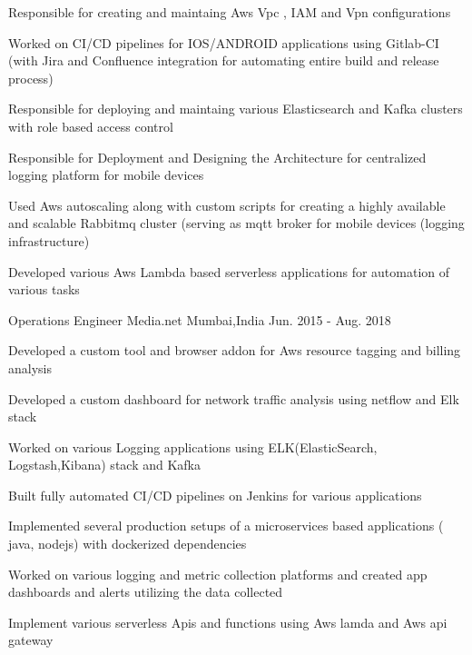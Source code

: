 \begin{cventries}
{\begin{cvitems}
	    \item { Responsible for creating and maintaing Aws Vpc , IAM and Vpn configurations}
		\item {Worked on CI/CD pipelines for IOS/ANDROID applications using Gitlab-CI (with Jira and Confluence integration for automating entire build and release process)}
		\item {Responsible for deploying and maintaing various Elasticsearch and Kafka clusters with role based access control }
		\item  { Responsible for Deployment and Designing the  Architecture for centralized logging platform for mobile devices}
		\item { Used Aws autoscaling along with custom scripts  for creating  a highly available and scalable   Rabbitmq cluster (serving as mqtt broker for mobile devices (logging infrastructure) }
		\item {Developed various  Aws Lambda based serverless applications for automation of various tasks }                   
	  \end{cvitems}
    }

  \cventry
    {Operations Engineer} %
    {Media.net} %
    {Mumbai,India} %
    {Jun. 2015 - Aug. 2018} %
    {
      \begin{cvitems} %
	    \item {Developed a custom tool and browser addon for Aws resource tagging and billing analysis }
		\item {Developed a custom dashboard for network traffic analysis using netflow and Elk stack }
        \item {Worked on various Logging applications using ELK(ElasticSearch, Logstash,Kibana) stack and Kafka}
        \item {Built fully automated CI/CD pipelines on Jenkins for various applications}
        \item {Implemented several production setups of a microservices based applications ( java, nodejs) with dockerized dependencies}
        \item {Worked on various logging and metric collection platforms and created app dashboards and alerts utilizing the data collected}
		\item {Implement various serverless Apis and functions using Aws lamda and Aws api gateway}
      \end{cvitems}
    }

\end{cventries}
